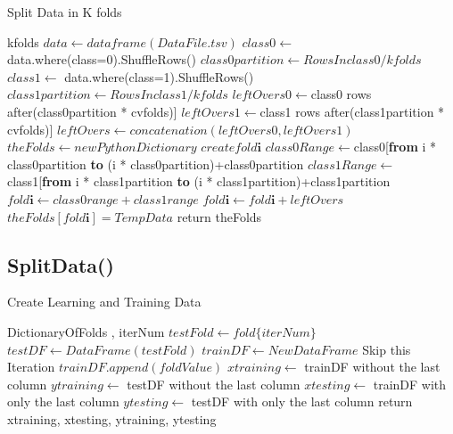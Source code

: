 \documentclass{article}
\begin{document}
\begin{algorithm}[H]
\caption{Split Data in K folds}
\begin{algorithmic}[1]
\REQUIRE kfolds  
\STATE $ data \gets dataframe(DataFile.tsv)$
\STATE $ class0 \gets $ data.where(class=0).ShuffleRows() 
\STATE $ class0partition \gets  Rows In class0 / kfolds $
\STATE $ class1 \gets $ data.where(class=1).ShuffleRows()
\STATE $ class1partition \gets  Rows In class1 / kfolds $
\STATE $ leftOvers0 \gets $class0 rows after(class0partition * cvfolds)]
\STATE $ leftOvers1 \gets $class1 rows after(class1partition * cvfolds)]
\STATE $ leftOvers \gets  concatenation(leftOvers0,leftOvers1)$
\STATE $ theFolds \gets newPythonDictionary$
        \STATE  $create fold\textbf{i} $  
      	\STATE $class0Range \gets $class0[\textbf{from} i * class0partition \textbf{to} (i * class0partition)+class0partition  
      	\STATE $class1Range \gets$ class1[\textbf{from} i * class1partition \textbf{to} (i * class1partition)+class1partition   
      	\STATE $fold\textbf{i} \gets class0range + class1range  $
	  	\STATE $fold\textbf{i} \gets fold\textbf{i} + leftOvers $ 
		\ENDIF	
    \STATE $theFolds[fold\textbf{i}] = TempData $  	
	\ENDFOR
\STATE return theFolds 
\end{algorithmic}
\end{algorithm}

 \subsection{SplitData()}
\begin{algorithm}[H]
\caption{Create Learning and Training Data}
\begin{algorithmic}[1]
\REQUIRE DictionaryOfFolds , iterNum 
\STATE $ testFold \gets fold\{iterNum\}$ 
\STATE $testDF \gets DataFrame(testFold) $
\STATE $trainDF \gets NewDataFrame $
		  	\STATE Skip this Iteration 
		\ENDIF
        \STATE $trainDF.append(foldValue)$
  	\ENDFOR
\STATE $xtraining \gets $ trainDF without the last column 
\STATE $ytraining \gets $ testDF without the last column
\STATE $xtesting \gets $ trainDF with only the last column
\STATE $ytesting \gets $ testDF with only the last column
\STATE return xtraining, xtesting, ytraining, ytesting

\end{algorithmic}
\end{algorithm}
\end{document}
